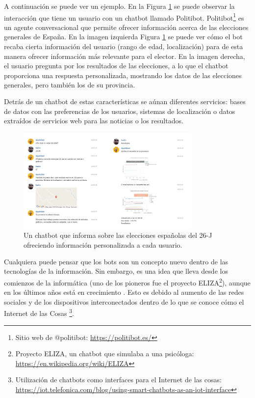 A continuación se puede ver un ejemplo. En la Figura \ref{fig:Politibot} se puede observar la interacción que tiene un usuario con un chatbot llamado Politibot. Politibot\footnote{Sitio web de @politibot: \url{https://politibot.es/}} es un agente conversacional que permite ofrecer información acerca de las elecciones generales de España. En la imagen izquierda Figura \ref{fig:Politibot} se puede ver cómo el bot recaba cierta información del usuario (rango de edad, localización) para de esta manera ofrecer información más relevante para el elector. En la imagen derecha, el usuario pregunta por los resultados de las elecciones, a lo que el chatbot proporciona una respuesta personalizada, mostrando los datos de las elecciones generales, pero también los de su provincia.

Detrás de un chatbot de estas características se aúnan diferentes servicios: bases de datos con las preferencias de los usuarios, sistemas de localización o datos extraídos de servicios web para las noticias o los resultados.

\begin{figure}[htb]
	\centering
	\includegraphics[width=0.8\textwidth]{./figs/Politibot.png}
	\caption{Un chatbot que informa sobre las elecciones españolas del 26-J ofreciendo información personalizada a cada usuario.}
	\label{fig:Politibot}
\end{figure}

Cualquiera puede pensar que los bots son un concepto nuevo dentro de las tecnologías de la información. Sin embargo, es una idea que lleva desde los comienzos de la informática (uno de los pioneros fue el proyecto ELIZA\footnote{Proyecto ELIZA, un chatbot que simulaba a una psicóloga: \url{https://en.wikipedia.org/wiki/ELIZA}}), aunque en los últimos años está en crecimiento \cite{Ferrara2016}. Esto es debido al aumento de las redes sociales y de los dispositivos interconectados dentro de lo que se conoce cómo el Internet de las Cosas \footnote{Utilización de chatbots como interfaces para el Internet de las cosas: \url{https://iot.telefonica.com/blog/using-smart-chatbots-as-an-iot-interface}}.


